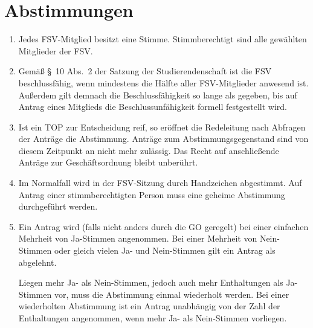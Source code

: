 \documentclass[
	a4paper,
	12pt,
	oneside,
	parskip=half-,
	pagesize,
	headsepline,
	german,
	ngerman
]{scrartcl}
\begin{document}
\section{Abstimmungen}
\label{sec:abstimmungen}
\begin{enumerate}
	\item Jedes FSV-Mitglied besitzt eine Stimme. Stimmberechtigt sind alle gewählten Mitglieder der FSV.
	\item Gemäß §~10 Abs.~2 der Satzung der Studierendenschaft ist die FSV beschlussfähig, wenn mindestens die Hälfte aller FSV-Mitglieder anwesend ist. Außerdem gilt demnach die Beschlussfähigkeit so lange als gegeben, bis auf Antrag eines Mitglieds die Beschlussunfähigkeit formell festgestellt wird.
	\item Ist ein TOP zur Entscheidung reif, so eröffnet die Redeleitung nach Abfragen der Anträge die Abstimmung. Anträge zum Abstimmungsgegenstand sind von diesem Zeitpunkt an nicht mehr zulässig. Das Recht auf anschließende Anträge zur Geschäftsordnung bleibt unberührt.
	\item Im Normalfall wird in der FSV-Sitzung durch Handzeichen abgestimmt. Auf Antrag einer stimmberechtigten Person muss eine geheime Abstimmung durchgeführt werden.
	\item Ein Antrag wird (falls nicht anders durch die GO geregelt) bei einer einfachen Mehrheit von Ja-Stimmen angenommen. Bei einer Mehrheit von Nein-Stimmen oder gleich vielen Ja- und Nein-Stimmen gilt ein Antrag als abgelehnt.
	
	Liegen mehr Ja- als Nein-Stimmen, jedoch auch mehr Enthaltungen als Ja-Stimmen vor, muss die Abstimmung einmal wiederholt werden. Bei einer wiederholten Abstimmung ist ein Antrag unabhängig von der Zahl der Enthaltungen angenommen, wenn mehr Ja- als Nein-Stimmen vorliegen.
\end{enumerate}
\end{document}
